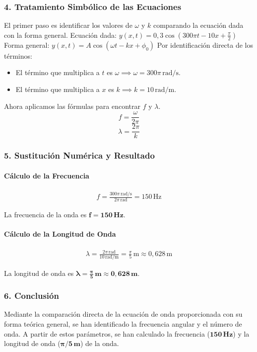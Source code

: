 \subsubsection*{4. Tratamiento Simbólico de las Ecuaciones}
El primer paso es identificar los valores de $\omega$ y $k$ comparando la ecuación dada con la forma general.
Ecuación dada: $y(x,t)=0,3\cos(300\pi t-10x+\frac{\pi}{2})$
Forma general: $y(x,t) = A\cos(\omega t - kx + \phi_0)$
Por identificación directa de los términos:
\begin{itemize}
    \item El término que multiplica a $t$ es $\omega \implies \omega = 300\pi \, \text{rad/s}$.
    \item El término que multiplica a $x$ es $k \implies k = 10 \, \text{rad/m}$.
\end{itemize}
Ahora aplicamos las fórmulas para encontrar $f$ y $\lambda$.
$$ f = \frac{\omega}{2\pi} $$
$$ \lambda = \frac{2\pi}{k} $$

\subsubsection*{5. Sustitución Numérica y Resultado}
\paragraph*{Cálculo de la Frecuencia}
\begin{gather}
    f = \frac{300\pi \, \text{rad/s}}{2\pi \, \text{rad}} = 150 \, \text{Hz}
\end{gather}
\begin{cajaresultado}
    La frecuencia de la onda es $\boldsymbol{f = 150 \, \textbf{Hz}}$.
\end{cajaresultado}

\paragraph*{Cálculo de la Longitud de Onda}
\begin{gather}
    \lambda = \frac{2\pi \, \text{rad}}{10 \, \text{rad/m}} = \frac{\pi}{5} \, \text{m} \approx 0,628 \, \text{m}
\end{gather}
\begin{cajaresultado}
    La longitud de onda es $\boldsymbol{\lambda = \frac{\pi}{5} \, \textbf{m} \approx 0,628 \, \textbf{m}}$.
\end{cajaresultado}

\subsubsection*{6. Conclusión}
\begin{cajaconclusion}
Mediante la comparación directa de la ecuación de onda proporcionada con su forma teórica general, se han identificado la frecuencia angular y el número de onda. A partir de estos parámetros, se han calculado la frecuencia ($\mathbf{150 \, Hz}$) y la longitud de onda ($\mathbf{\pi/5 \, m}$) de la onda.
\end{cajaconclusion}


